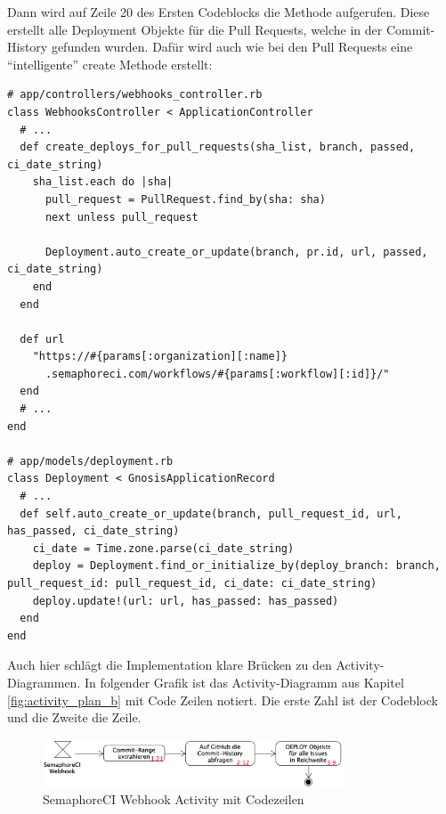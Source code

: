 Dann wird auf Zeile 20 des Ersten Codeblocks die Methode 
aufgerufen. Diese erstellt alle Deployment Objekte für die Pull Requests, welche in der Commit-History gefunden wurden.
Dafür wird auch wie bei den Pull Requests eine \enquote{intelligente} create Methode erstellt:
\begin{codebox}[]
  \begin{verbatim}
# app/controllers/webhooks_controller.rb
class WebhooksController < ApplicationController
  # ...
  def create_deploys_for_pull_requests(sha_list, branch, passed, ci_date_string)
    sha_list.each do |sha|
      pull_request = PullRequest.find_by(sha: sha)
      next unless pull_request

      Deployment.auto_create_or_update(branch, pr.id, url, passed, ci_date_string)
    end
  end

  def url
    "https://#{params[:organization][:name]}
      .semaphoreci.com/workflows/#{params[:workflow][:id]}/"
  end
  # ...
end

# app/models/deployment.rb
class Deployment < GnosisApplicationRecord
  # ...
  def self.auto_create_or_update(branch, pull_request_id, url, has_passed, ci_date_string)
    ci_date = Time.zone.parse(ci_date_string)
    deploy = Deployment.find_or_initialize_by(deploy_branch: branch, pull_request_id: pull_request_id, ci_date: ci_date_string)
    deploy.update!(url: url, has_passed: has_passed)
  end
end
  \end{verbatim}
\end{codebox}

\newpage
Auch hier schlägt die Implementation klare Brücken zu den Activity-Diagrammen. In folgender Grafik ist das
Activity-Diagramm aus Kapitel \ref{fig:activity_plan_b} mit Code Zeilen notiert. Die erste Zahl ist der Codeblock und
die Zweite die Zeile.
\begin{figure}[H]
  \centering
  \includegraphics[width=0.8\textwidth]{images/activity/plan_b_code.png}
  \caption[Activity Diagramm zu SemaphoreCI Webhook Daten mit Codezeilen]{SemaphoreCI Webhook Activity mit Codezeilen}
  \label{fig:activity_plan_b_code}
\end{figure}

